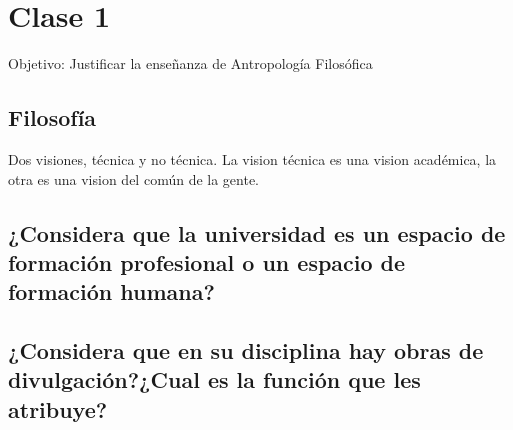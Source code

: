     \tableofcontents

    \chapter{Clase 1}
    Objetivo: Justificar la enseñanza de Antropología Filosófica\\
    \section{Filosofía}
    Dos visiones, técnica y no técnica. La vision técnica es una vision académica, la otra es una vision del común de la gente.\\
    \section{¿Considera que la universidad es un espacio de formación profesional o un espacio de formación humana?}
    \section{¿Considera que en su disciplina hay obras de divulgación?¿Cual es la función que les atribuye?}
